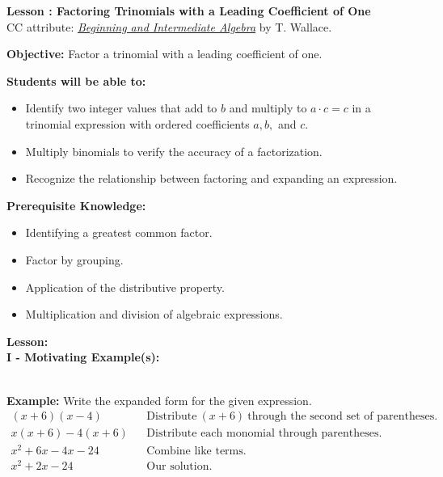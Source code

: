 \documentclass[12pt]{article}
\theoremstyle{definition}
\begin{document}
{\bf \large Lesson : Factoring Trinomials with a Leading Coefficient of One}\label{les:factoring_trinomials_a_is_1}
\\ CC attribute: \href{http://www.wallace.ccfaculty.org/book/book.html}{\it{Beginning and Intermediate Algebra}} by T. Wallace. 
\hfill \doclicenseImage[imagewidth=5em]\\
\par
{\bf Objective:} Factor a trinomial with a leading coefficient of one.\\
\par
{\bf Students will be able to:}
\begin{itemize}
	\item Identify two integer values that add to $b$ and multiply to $a\cdot c=c$ in a trinomial expression with ordered coefficients $a,b,$ and $c$.
	\item Multiply binomials to verify the accuracy of a factorization.
	\item Recognize the relationship between factoring and expanding an expression.
\end{itemize}
{\bf Prerequisite Knowledge:}
\begin{itemize}
	\item Identifying a greatest common factor.
	\item Factor by grouping.
	\item Application of the distributive property.
	\item Multiplication and division of algebraic expressions.
\end{itemize}
\hrulefill

{\bf Lesson:}\\
{\bf I - Motivating Example(s):}\\
\ \par
{\bf Example:} Write the expanded form for the given expression.
  \begin{eqnarray*}
    (x + 6) (x - 4) &  & \text{Distribute} \ (x + 6) \ \text{through the second set of parentheses.}\\
    x (x + 6) - 4 (x + 6) &  & \text{Distribute each monomial through parentheses.}\\
    x^2 + 6 x - 4 x - 24 &  & \text{Combine like terms.}\\
    x^2 + 2 x - 24 &  & \text{Our solution.}
  \end{eqnarray*}	
\end{document}
